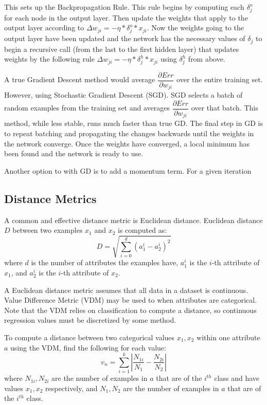 \documentclass[twoside,11pt]{article}
\begin{document}
This sets up the Backpropagation Rule. This rule begins by computing each $\delta _j^o$ for each node in the output layer. Then update the weights that apply to the output layer according to 
$\Delta w_{ji} = - \eta * \delta _j^o * x_{ji}$.
Now the weights going to the output layer have been updated and the network has the necessary values of $\delta _j$ to begin a recursive call (from the last to the first hidden layer) that updates weights by the following rule
$\Delta w_{ji} = - \eta * \delta _j^h * x_{ji}$ using $\delta _j^h$ 
from above.

A true Gradient Descent method would average $\dfrac{\partial Err}{\partial w_{ji}}$ over the entire training set. However, using Stochastic Gradient Descent (SGD). SGD selects a batch of random examples from the training set and averages $\dfrac{\partial Err}{\partial w_{ji}}$ over that batch. This method, while less stable, runs much faster than true GD.
The final step in GD is to repeat batching and propagating the changes backwards until the weights in the network converge. Once the weights have converged, a local minimum has been found and the network is ready to use.

Another option to with GD is to add a momentum term. For a given iteration 

\subsection{Distance Metrics}

A common and effective distance metric is Euclidean distance. Euclidean distance $D$ between two examples $x_1$ and $x_2$ is computed as:
$$D = \sqrt{\sum_{i=0}^{d}(a_1^i - a_2^i)^2}$$
where $d$ is the number of attributes the examples have, $a_1^i$ is the $i$-th attribute of $x_1$, and $a_2^i$ is the $i$-th attribute of $x_2$.

A Euclidean distance metric assumes that all data in a dataset is continuous. Value Difference Metric (VDM) may be used to when attributes are categorical. Note that the VDM relies on classification to compute a distance, so continuous regression values must be discretized by some method. %

To compute a distance between two categorical values $x_1, x_2$ within one attribute $a$ using the VDM, find the following for each value:
$$ v_n = \sum _{i = 1}^{k} | \dfrac{N_{1i}}{N_1} - \dfrac{N_{2i}}{N_2} | $$
where $N_{1i}, N_{2i}$ are the number of examples in $a$ that are of the $i^{th}$ class and have values $x_1, x_2$ respectively, and $N_1, N_2$ are the number of examples in $a$ that are of the $i^{th}$ class.
\end{document}
